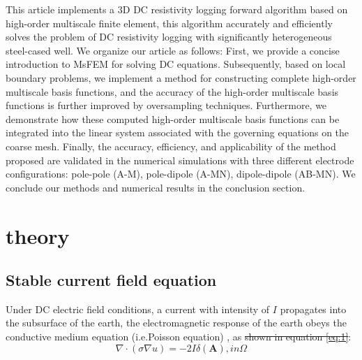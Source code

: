 \documentclass[manuscript,blind]{geophysics}
\providecommand{\DIFadd}[1]{{\protect\color{blue}\uwave{#1}}} %
\providecommand{\DIFdel}[1]{{\protect\color{red}\sout{#1}}}                      %
\providecommand{\DIFaddbegin}{} %
\providecommand{\DIFaddend}{} %
\providecommand{\DIFdelbegin}{} %
\providecommand{\DIFdelend}{} %
\newcommand{\DIFscaledelfig}{0.5}
\newlength{\DIFdelgraphicswidth} %
\newlength{\DIFdelgraphicsheight} %
\newcommand{\DIFaddincludegraphics}[2][]{{\color{blue}\fbox{\DIFOincludegraphics[#1]{#2}}}} %
\newcommand{\DIFdelincludegraphics}[2][]{%
\sbox{\DIFdelgraphicsbox}{\DIFOincludegraphics[#1]{#2}}%
\settoboxwidth{\DIFdelgraphicswidth}{\DIFdelgraphicsbox} %
\settoboxtotalheight{\DIFdelgraphicsheight}{\DIFdelgraphicsbox} %
\scalebox{\DIFscaledelfig}{%
\parbox[b]{\DIFdelgraphicswidth}{\usebox{\DIFdelgraphicsbox}\\[-\baselineskip] \rule{\DIFdelgraphicswidth}{0em}}\llap{\resizebox{\DIFdelgraphicswidth}{\DIFdelgraphicsheight}{%
\setlength{\unitlength}{\DIFdelgraphicswidth}%
\begin{picture}(1,1)%
\thicklines\linethickness{2pt} %
{\color[rgb]{1,0,0}\put(0,0){\framebox(1,1){}}}%
{\color[rgb]{1,0,0}\put(0,0){\line( 1,1){1}}}%
{\color[rgb]{1,0,0}\put(0,1){\line(1,-1){1}}}%
\end{picture}%
}\hspace*{3pt}}} %
} %
\DeclareRobustCommand{\DIFaddbegin}{\DIFOaddbegin \let\includegraphics\DIFaddincludegraphics} %
\DeclareRobustCommand{\DIFaddend}{\DIFOaddend \let\includegraphics\DIFOincludegraphics} %
\DeclareRobustCommand{\DIFdelbegin}{\DIFOdelbegin \let\includegraphics\DIFdelincludegraphics} %
\DeclareRobustCommand{\DIFdelend}{\DIFOaddend \let\includegraphics\DIFOincludegraphics} %
\begin{document}
This article implements a 3D DC resistivity logging forward algorithm based on high-order multiscale finite element, this algorithm accurately and efficiently solves the problem of DC resistivity logging with significantly heterogeneous steel-cased well. We organize our article as follows: First, we provide a concise introduction to MsFEM for solving DC equations. Subsequently, based on local boundary problems, we implement a method for constructing complete high-order multiscale basis functions, and the accuracy of the high-order multiscale basis functions is further improved by oversampling techniques. Furthermore, we demonstrate how these computed high-order multiscale basis functions can be integrated into the linear system associated with the governing equations on the coarse mesh. Finally, the accuracy, efficiency, and applicability of the method proposed are validated in the numerical simulations with three different electrode configurations: pole-pole (A-M), pole-dipole (A-MN), dipole-dipole (AB-MN). We conclude our methods and numerical results in the conclusion section.



\section{theory}

\subsection{Stable current field equation}
Under DC electric field conditions, a current with intensity of $I$ propagates into the subsurface of the earth, the electromagnetic response of the earth obeys the conductive medium equation (i.e.Poisson equation) \citep{wang2013three}, as \DIFdelbegin \DIFdel{shown in equation \ref{eq:1}}\DIFdelend \DIFaddbegin \DIFadd{follows}\DIFaddend :
\begin{equation}
  \label{eq:1}
  \nabla \cdot (\sigma\nabla{u} ) = -2 I\delta( \mathbf{A}) ,in \Omega
\end{equation}
\end{document}
